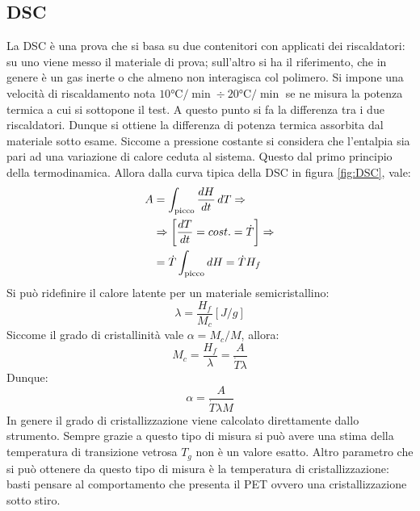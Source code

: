 \subsection{DSC}
La \ac{DSC} è una prova che si basa su due contenitori con applicati dei riscaldatori: su uno viene messo il materiale di prova; sull'altro si ha il riferimento, che in genere è un gas inerte o che almeno non interagisca col polimero. Si impone una velocità di riscaldamento nota $10\unit{\celsius/\min} \div 20\unit{\celsius/\min}$ se ne misura la potenza termica a cui si sottopone il test.
A questo punto si fa la differenza tra i due riscaldatori. Dunque si ottiene la differenza di potenza termica assorbita dal materiale sotto esame.
Siccome a pressione costante si considera che l'entalpia sia pari ad una variazione di calore ceduta al sistema. Questo dal primo principio della termodinamica. Allora dalla curva tipica della \ac{DSC} in figura \ref{fig:DSC}, vale:
\begin{equation}
\begin{split}
A &= \int_{\textup{picco}}{\frac{dH}{dt}\,dT} \Rightarrow\\
&\Rightarrow \left[\frac{dT}{dt} = cost. = \dot{T}\right] \Rightarrow\\
&= \dot{T}\int_{\textup{picco}}{dH} = \dot{T}H_f
\end{split}
\end{equation}
Si può ridefinire il calore latente per un materiale semicristallino:
\begin{equation}
\lambda = \frac{H_f}{M_c}\left[J/g\right]
\end{equation}
Siccome il grado di cristallinità vale $\alpha = M_c/M$, allora:
\begin{equation}
M_c = \frac{H_f}{\lambda} = \frac{A}{\dot{T}\lambda}
\end{equation}
Dunque:
\begin{equation}
\alpha = \frac{A}{\dot{T}\lambda M}
\end{equation}
In genere il grado di cristallizzazione viene calcolato direttamente dallo strumento.
Sempre grazie a questo tipo di misura si può avere una stima della temperatura di transizione vetrosa $T_g$ non è un valore esatto.
Altro parametro che si può ottenere da questo tipo di misura è la temperatura di cristallizzazione: basti pensare al comportamento che presenta il \ac{PET} ovvero una cristallizzazione sotto stiro.

